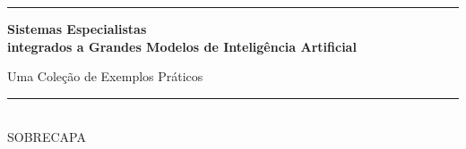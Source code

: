 \begin{titlepage}
\thispagestyle{empty}
\pagecolor{bookpaper}
\color{booknavy}
\vspace*{1.2cm}
\noindent\textcolor{bookgold}{\rule{0.18\textwidth}{2pt}}\par
\vspace{1.7cm}
\noindent\resizebox{\textwidth}{!}{}\par
\vspace{0.7cm}
{\sffamily\bfseries\fontsize{25}{31}\selectfont
Sistemas Especialistas\\[0.15em]
\textcolor{bookgold}{integrados a Grandes Modelos de Inteligência Artificial}\par}
\vspace{0.65cm}
{\sffamily\large Uma Coleção de Exemplos Práticos\par}
\vfill
\begin{flushright}
\textcolor{bookgold}{\rule{0.42\textwidth}{1pt}}\\[0.5em]
{\sffamily\small SOBRECAPA}
\end{flushright}
\vspace{1cm}
\end{titlepage}
\nopagecolor